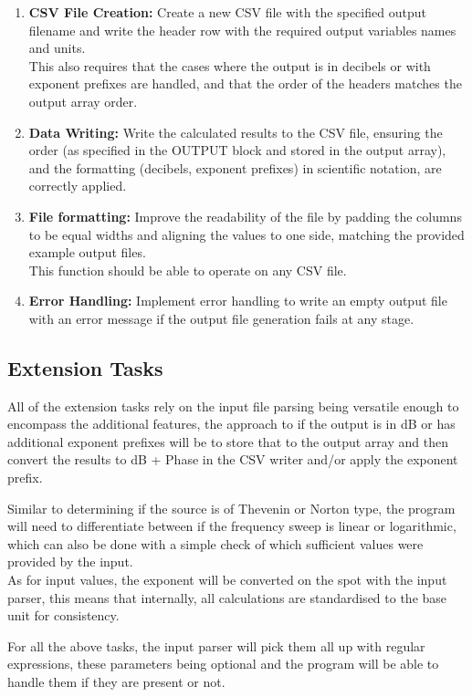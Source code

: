 \documentclass[a4paper]{article}
\begin{document}
\begin{enumerate}
    \item \textbf{CSV File Creation:} Create a new CSV file with the specified output filename and write the header row with the required output variables names and units.\\
    This also requires that the cases where the output is in decibels or with exponent prefixes are handled, and that the order of the headers matches the output array order.
    \item \textbf{Data Writing:} Write the calculated results to the CSV file, ensuring the order (as specified in the OUTPUT block and stored in the output array), 
    and the formatting (decibels, exponent prefixes) in scientific notation, are correctly applied.
    \item \textbf{File formatting:} Improve the readability of the file by padding the columns to be equal widths and aligning the values to one side, matching the provided example output files.\\
    This function should be able to operate on any CSV file.
    \item \textbf{Error Handling:} Implement error handling to write an empty output file with an error message if the output file generation fails at any stage.
\end{enumerate}

\subsection*{Extension Tasks}
All of the extension tasks rely on the input file parsing being versatile enough to encompass the 
additional features, the approach to if the output is in dB or has additional exponent prefixes will be to store that to the output 
array and then convert the results to dB + Phase in the CSV writer and/or apply the exponent prefix.

 Similar to determining if the source is of Thevenin or Norton type, the program will need to differentiate between if the frequency sweep is linear or logarithmic,
 which can also be done with a simple check of which sufficient values were provided by the input.\\

As for input values, the exponent will be converted on the spot with the input parser, this means that internally, all calculations are standardised to the base unit for consistency.

For all the above tasks, the input parser will pick them all up with regular expressions, these parameters being optional and the program will be able to handle them if they are present or not.
\end{document}
